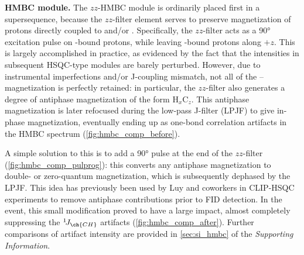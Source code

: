 \documentclass[a4paper,11pt]{article}
\newcommand{\proton}{\ch{^{1}H}}
\newcommand{\carbonbulk}{\ch{^{12}C}}
\newcommand{\carbon}{\ch{^{13}C}}
\newcommand{\nitrogen}{\ch{^{15}N}}
\newcommand{\CH}{\carbon{}--\proton{}}
\newcommand{\onejch}{{}^1\!J_{\ch{CH}}}
\begin{document}
\begin{refsection}
\textbf{\carbon{} HMBC module.} The \(zz\)-HMBC module is ordinarily placed first in a supersequence, because the \(zz\)-filter element serves to preserve magnetization of protons directly coupled to \carbon{} and/or \nitrogen{}.\autocite{Kupce2018CC,Kupce2019JMR}
Specifically, the \(zz\)-filter acts as a \ang{90} excitation pulse on \carbonbulk{}-bound protons, while leaving \carbon{}-bound protons along \(+z\).
This is largely accomplished in practice, as evidenced by the fact that the intensities in subsequent HSQC-type modules are barely perturbed.
However, due to instrumental imperfections and/or J-coupling mismatch, not all of the \CH{} magnetization is perfectly retained: in particular, the \(zz\)-filter also generates a degree of antiphase magnetization of the form \(\mathrm{H}_x\mathrm{C}_z\).
This antiphase magnetization is later refocused during the low-pass J-filter (LPJF) to give in-phase magnetization, eventually ending up as one-bond correlation artifacts in the HMBC spectrum (\cref{fig:hmbc_comp_before}).

A simple solution to this is to add a \carbon{} \ang{90} pulse at the end of the \(zz\)-filter (\cref{fig:hmbc_comp_pulprog}): this converts any antiphase magnetization to double- or zero-quantum magnetization, which is subsequently dephased by the LPJF.
This idea has previously been used by Luy and coworkers in CLIP-HSQC experiments to remove antiphase contributions prior to FID detection.\autocite{Enthart2008JMR}
In the event, this small modification proved to have a large impact, almost completely suppressing the \(\onejch\) artifacts (\cref{fig:hmbc_comp_after}).
Further comparisons of artifact intensity are provided in \cref{sec:si_hmbc} of the \textit{Supporting Information}.


\end{refsection}
\end{document}
